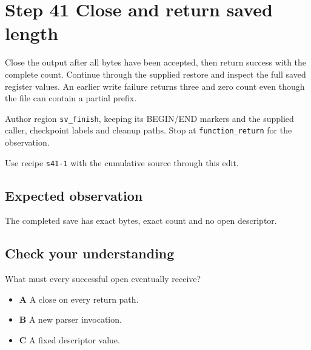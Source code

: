 \section{Step 41 Close and return saved length}\label{ppm-s41}

Close the output after all bytes have been accepted, then return success with the complete count. Continue through the supplied restore and inspect the full saved register values. An earlier write failure returns three and zero count even though the file can contain a partial prefix.

Author region \texttt{sv\_finish}, keeping its BEGIN/END markers and the supplied caller, checkpoint labels and cleanup paths. Stop at \texttt{function\_return} for the observation.

Use recipe \texttt{s41-1} with the cumulative source through this edit.

\subsection{Expected observation}
The completed save has exact bytes, exact count and no open descriptor.

\subsection{Check your understanding}
What must every successful open eventually receive?

\begin{itemize}
  \item \textbf{A} A close on every return path.
  \item \textbf{B} A new parser invocation.
  \item \textbf{C} A fixed descriptor value.
\end{itemize}
